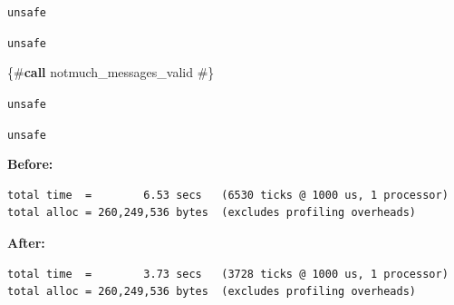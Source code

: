 \documentclass[ignorenonframetext,aspectratio=169]{beamer}
\newenvironment{Shaded}{}{}
\newcommand{\KeywordTok}[1]{\textcolor[rgb]{0.00,0.44,0.13}{\textbf{{#1}}}}
\newcommand{\DataTypeTok}[1]{\textcolor[rgb]{0.56,0.13,0.00}{{#1}}}
\newcommand{\StringTok}[1]{\textcolor[rgb]{0.25,0.44,0.63}{{#1}}}
\newcommand{\OtherTok}[1]{\textcolor[rgb]{0.00,0.44,0.13}{{#1}}}
\newcommand{\NormalTok}[1]{{#1}}
\newcommand\greyuline{\bgroup\markoverwith
    {\textcolor{lightgray}{\rule[-0.5ex]{2pt}{0.4pt}}}\ULon}
\begin{document}
\begin{frame}[fragile]{\texttt{unsafe}}

\begin{Shaded}
\end{Shaded}

\end{frame}

\begin{frame}[fragile]{\texttt{unsafe}}

\begin{Shaded}
\begin{Highlighting}[]
\StringTok{\{#}\KeywordTok{call}        \StringTok{notmuch_messages_valid #\}}
\end{Highlighting}
\end{Shaded}

\end{frame}

\begin{frame}[fragile]{\texttt{unsafe}}

\begin{Shaded}
\end{Shaded}

\end{frame}

\begin{frame}[fragile]{\texttt{unsafe}}

{\bf Before:}

\begin{verbatim}
total time  =        6.53 secs   (6530 ticks @ 1000 us, 1 processor)
total alloc = 260,249,536 bytes  (excludes profiling overheads)
\end{verbatim}

{\bf After:}

\begin{verbatim}
total time  =        3.73 secs   (3728 ticks @ 1000 us, 1 processor)
total alloc = 260,249,536 bytes  (excludes profiling overheads)
\end{verbatim}

\end{frame}
\end{document}
